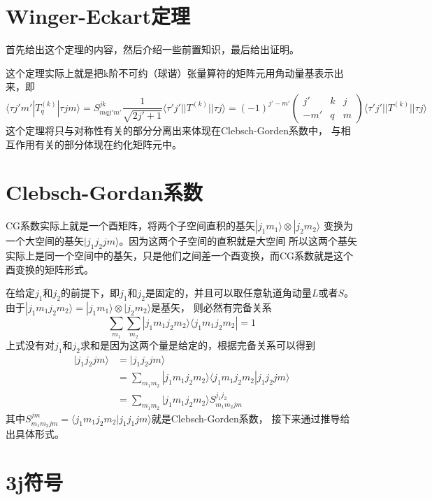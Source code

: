 \documentclass{article}
\begin{document}
\section*{Winger-Eckart定理}
首先给出这个定理的内容，然后介绍一些前置知识，最后给出证明。

这个定理实际上就是把k阶不可约（球谐）张量算符的矩阵元用角动量基表示出来，即
\begin{equation}
    \langle \tau j'm'|T_{q}^{(k)}|\tau jm\rangle 
    = S_{mqj'm'}^{jk} \frac{1}{\sqrt{2j'+1}}\langle\tau' j'||T^{(k)}||\tau j\rangle
    = (-1)^{j'-m'}
    \begin{pmatrix}
        j' & k & j\\
        -m' & q & m
    \end{pmatrix}
    \langle\tau' j'||T^{(k)}||\tau j\rangle
\end{equation}
这个定理将只与对称性有关的部分分离出来体现在Clebsch-Gorden系数中，
与相互作用有关的部分体现在约化矩阵元中。


\section*{Clebsch-Gordan系数}
CG系数实际上就是一个酉矩阵，将两个子空间直积的基矢$|j_1 m_1\rangle\otimes |j_2 m_2\rangle$
变换为一个大空间的基矢$|j_1 j_2 jm\rangle$。因为这两个子空间的直积就是大空间
所以这两个基矢实际上是同一个空间中的基矢，只是他们之间差一个酉变换，而CG系数就是这个酉变换的矩阵形式。

在给定$j_1$和$j_2$的前提下，即$j_1$和$j_2$是固定的，并且可以取任意轨道角动量$L$或者$S$。
由于$|j_1 m_1 j_2 m_2\rangle = |j_1 m_1\rangle\otimes |j_2 m_2\rangle$是基矢，
则必然有完备关系
\begin{equation}
    \sum_{m_1}\sum_{m_2}|j_1 m_1 j_2 m_2\rangle\langle j_1 m_1 j_2 m_2| = 1
\end{equation}
上式没有对$j_1$和$j_2$求和是因为这两个量是给定的，根据完备关系可以得到
\begin{equation}
    \begin{aligned}
        |j_1 j_2 jm\rangle
        &= |j_1 j_2 jm\rangle\\
        &= \sum_{m_1 m_2}|j_1 m_1 j_2 m_2\rangle\langle j_1 m_1 j_2 m_2|j_1 j_2 jm\rangle\\
        &= \sum_{m_1 m_2}|j_1 m_1 j_2 m_2\rangle S_{m_1 m_2 jm}^{j_1 j_2}
    \end{aligned}
\end{equation}
其中$S_{m_1 m_2 jm}^{jm}=\langle j_1 m_1 j_2 m_2|j_1 j_1 jm\rangle$就是Clebsch-Gorden系数，
接下来通过推导给出具体形式。


\section*{3j符号}
\end{document}

